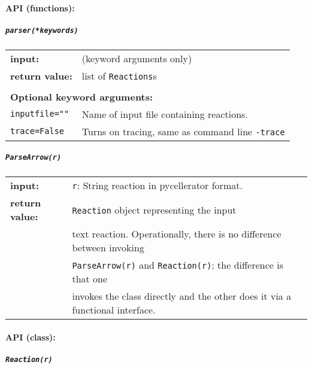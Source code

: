 \paragraph{API (functions):}

\subparagraph{\tt parser(*keywords)\\}

\begin{tabular}{ll}
\textbf{input:} & (keyword arguments only) \\
\textbf{return value:}& list of {\tt Reactions}s  \\  \\
\multicolumn{2}{l}{\textbf{Optional keyword arguments:}}\\
{\tt inputfile=""} & Name of input file containing reactions.\\
{\tt trace=False} & Turns on tracing, same as command line {\tt -trace}
\end{tabular}

\subparagraph{\tt ParseArrow(r)\\}

\begin{tabular}{ll}
\textbf{input:} & {\tt r}: String reaction in pycellerator format. \\
\textbf{return value:} & {\tt Reaction} object representing the input \\
& text reaction.  Operationally, there is no difference between invoking \\
& {\tt ParseArrow(r)} and {\tt Reaction(r)}; the difference is that one \\
& invokes the class directly and the other does it via a functional interface.
\end{tabular}

\clearpage
\paragraph{API (class):}

\subparagraph{\tt Reaction(r)\\}

